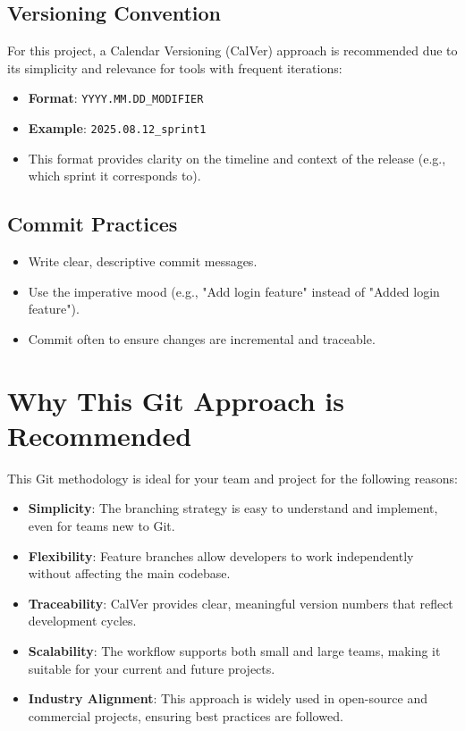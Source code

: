 \subsection*{Versioning Convention}
For this project, a Calendar Versioning (CalVer) approach is recommended due to its simplicity and relevance for tools with frequent iterations:
\begin{itemize}
    \item \textbf{Format}: \texttt{YYYY.MM.DD\_MODIFIER}
    \item \textbf{Example}: \texttt{2025.08.12\_sprint1}
    \item This format provides clarity on the timeline and context of the release (e.g., which sprint it corresponds to).
\end{itemize}

\subsection*{Commit Practices}
\begin{itemize}
    \item Write clear, descriptive commit messages.
    \item Use the imperative mood (e.g., "Add login feature" instead of "Added login feature").
    \item Commit often to ensure changes are incremental and traceable.
\end{itemize}

\section{Why This Git Approach is Recommended}
This Git methodology is ideal for your team and project for the following reasons:
\begin{itemize}
    \item \textbf{Simplicity}: The branching strategy is easy to understand and implement, even for teams new to Git.
    \item \textbf{Flexibility}: Feature branches allow developers to work independently without affecting the main codebase.
    \item \textbf{Traceability}: CalVer provides clear, meaningful version numbers that reflect development cycles.
    \item \textbf{Scalability}: The workflow supports both small and large teams, making it suitable for your current and future projects.
    \item \textbf{Industry Alignment}: This approach is widely used in open-source and commercial projects, ensuring best practices are followed.
\end{itemize}

